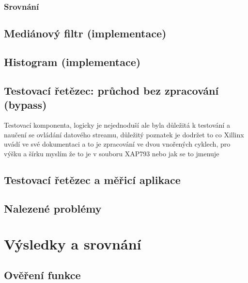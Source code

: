 \documentclass[FM,DP]{tulthesis}
\begin{document}
\subsection{Srovnání}

\section{Mediánový filtr (implementace)}

\section{Histogram (implementace)}

\section{Testovací řetězec: průchod bez zpracování (bypass)}
Testovací komponenta, logicky je nejednoduší ale byla důležitá k testování a
naučení se ovládání datového streamu, důležitý poznatek je dodržet to co
Xillinx uvádí ve své dokumentaci a to je zpracování ve dvou vnořených cyklech,
pro výšku a šírku myslím že to je v souboru XAP793 nebo jak se to jmenuje

\section{Testovací řetězec a měřicí aplikace}
\label{sec:retezec}

\section{Nalezené problémy}
\label{sec:problemy}

\chapter{Výsledky a srovnání}
\label{kap:vysledky}

\section{Ověření funkce}
\end{document}
